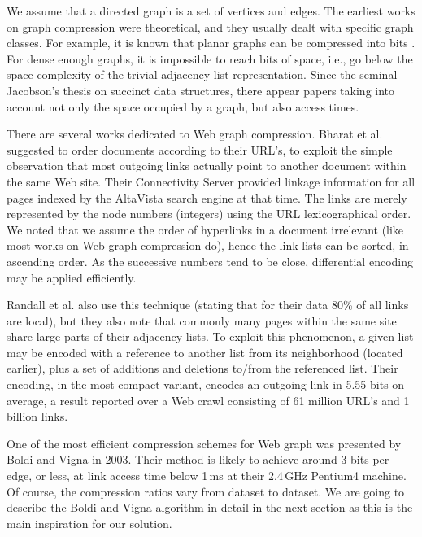 \documentclass[envcountsame]{llncs}
\begin{document}
We assume that a directed graph  is a set of  vertices and 
 edges.
The earliest works on graph compression were theoretical, and they usually dealt 
with specific graph classes.  For example, it is known that planar graphs can be 
compressed into  bits \cite{Turan84,DBLP:journals/siamcomp/HeKL00}.  
For dense enough graphs, it is impossible to reach  bits of space, 
i.e., go below the space complexity of the trivial adjacency list representation.
Since the seminal Jacobson's thesis \cite{Jac89} on succinct data 
structures, there appear papers taking into account not only the space occupied 
by a graph, but also access times.

There are several works dedicated to Web graph compression.  Bharat et al. 
\cite{DBLP:journals/cn/BharatBHKV98}
suggested to order documents according to their URL's, to exploit the simple 
observation that most outgoing links actually point to another document within 
the same Web site.  Their Connectivity Server provided linkage information 
for all pages indexed by the AltaVista search engine at that time.
The links are merely represented by the node numbers (integers) using the URL 
lexicographical order.  We noted that we assume the order of hyperlinks in a 
document irrelevant (like most works on Web graph compression do), hence 
the link lists can be sorted, in ascending order.
As the successive numbers tend to be close, differential encoding may be applied 
efficiently.

Randall et al. \cite{randall01link} also use this technique (stating that for 
their data 80\% of all links are local), but they also note that commonly many 
pages within the same site share large parts of their adjacency lists.  
To exploit this phenomenon, a given list may be encoded with a reference to another 
list from its neighborhood (located earlier), plus a set of additions and deletions 
to/from the referenced list.
Their encoding, in the most compact variant, encodes an outgoing link in 5.55 bits 
on average, a result reported over a Web crawl consisting of 61 million URL's and 
1 billion links.

One of the most efficient compression schemes for Web graph was presented by
Boldi and Vigna \cite{DBLP:conf/www/BoldiV04} in 2003. Their method is likely to 
achieve around 3 bits per edge, or less, at link access time below 1\,ms at their 
2.4\,GHz Pentium4 machine.  Of course, the compression ratios vary from dataset 
to dataset. We are going to describe the Boldi and Vigna algorithm in detail in 
the next section as this is the main inspiration for our solution.
\end{document}
